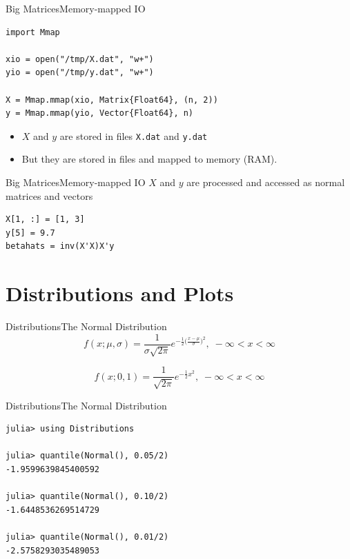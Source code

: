 \documentclass[11pt]{beamer}
\begin{document}
\begin{frame}[fragile]{Big Matrices}{Memory-mapped IO}
\begin{lstlisting}
import Mmap

xio = open("/tmp/X.dat", "w+")
yio = open("/tmp/y.dat", "w+")

X = Mmap.mmap(xio, Matrix{Float64}, (n, 2))
y = Mmap.mmap(yio, Vector{Float64}, n)		
\end{lstlisting}
\begin{itemize}
	\item $X$ and $y$ are stored in files \texttt{X.dat} and \texttt{y.dat}
	\item But they are stored in files and mapped to memory (RAM).
\end{itemize}
\end{frame}


\begin{frame}[fragile]{Big Matrices}{Memory-mapped IO}
$X$ and $y$ are processed and accessed as normal matrices and vectors
\begin{lstlisting}
X[1, :] = [1, 3]
y[5] = 9.7
betahats = inv(X'X)X'y
\end{lstlisting}
\end{frame}

\section{Distributions and Plots}
\begin{frame}[fragile]{Distributions}{The Normal Distribution}
\begin{equation}
f(x; \mu, \sigma) = \frac{1}{\sigma \sqrt{2\pi}} e^{-\frac{1}{2}\big(\frac{x - \mu}{\sigma}\big)^2}, \; -\infty < x < \infty
\end{equation}

\begin{equation}
	f(x; 0, 1) = \frac{1}{\sqrt{2\pi}} e^{-\frac{1}{2}x^2}, \; -\infty < x < \infty
\end{equation}
\end{frame}

\begin{frame}[fragile]{Distributions}{The Normal Distribution}
\begin{lstlisting}
julia> using Distributions

julia> quantile(Normal(), 0.05/2)
-1.9599639845400592

julia> quantile(Normal(), 0.10/2)
-1.6448536269514729

julia> quantile(Normal(), 0.01/2)
-2.5758293035489053
\end{lstlisting}
\end{frame}
\end{document}

